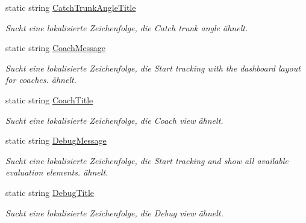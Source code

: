 \begin{DoxyCompactItemize}
static string \hyperlink{class_rowing_monitor_1_1_properties_1_1_resources_a1a12bdf0feea59667d2d272370806cfa}{Catch\+Trunk\+Angle\+Title}
\begin{DoxyCompactList}\small\item\em Sucht eine lokalisierte Zeichenfolge, die Catch trunk angle ähnelt. \end{DoxyCompactList}\item 
static string \hyperlink{class_rowing_monitor_1_1_properties_1_1_resources_aaff4b4081f166baef8672bd7a8fb0a46}{Coach\+Message}
\begin{DoxyCompactList}\small\item\em Sucht eine lokalisierte Zeichenfolge, die Start tracking with the dashboard layout for coaches. ähnelt. \end{DoxyCompactList}\item 
static string \hyperlink{class_rowing_monitor_1_1_properties_1_1_resources_a23437e7fcfbd5a143a7dcb88fd19ae11}{Coach\+Title}
\begin{DoxyCompactList}\small\item\em Sucht eine lokalisierte Zeichenfolge, die Coach view ähnelt. \end{DoxyCompactList}\item 
static string \hyperlink{class_rowing_monitor_1_1_properties_1_1_resources_a31be075f6145a715b6449bd05c48a441}{Debug\+Message}
\begin{DoxyCompactList}\small\item\em Sucht eine lokalisierte Zeichenfolge, die Start tracking and show all available evaluation elements. ähnelt. \end{DoxyCompactList}\item 
static string \hyperlink{class_rowing_monitor_1_1_properties_1_1_resources_ac197e44538c0c710513c11a63d98f236}{Debug\+Title}
\begin{DoxyCompactList}\small\item\em Sucht eine lokalisierte Zeichenfolge, die Debug view ähnelt. \end{DoxyCompactList}\item 

\end{DoxyCompactItemize}
